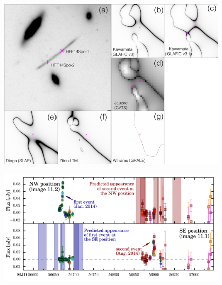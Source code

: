 \documentclass{nature_arxiv}
\begin{document}
\begin{multicols}{2}
\begin{figure}[tbp]
  \begin{center}
    \includegraphics[width=\textwidth]{./figures/spock_critical_curves/spock_critical_curves}
    \caption{\protect}
  \end{center}
\end{figure}

\begin{figure}[tbp]
  \begin{center}
    \includegraphics[width=\textwidth]{./figures/spock_predictions/spock_predictions}
    \caption{\protect}
  \end{center}
\end{figure}






\end{multicols}
\end{document}
